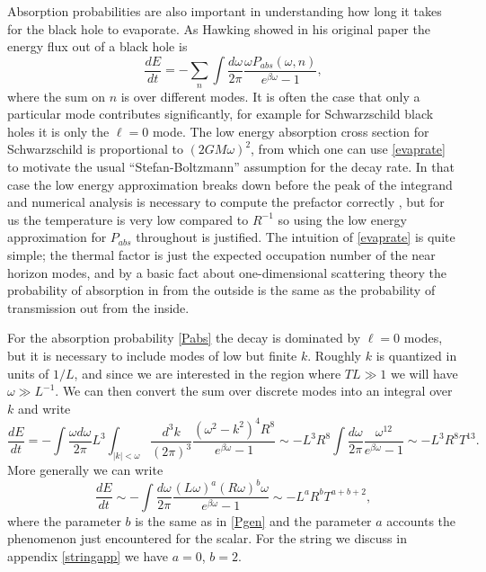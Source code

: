 \documentclass[12pt]{article}
\newcommand{\be}{\begin{equation}}
\newcommand{\ee}{\end{equation}}
\begin{document}
Absorption probabilities are also important in understanding how long it takes for the black hole to evaporate.  As Hawking showed in his original paper \cite{Hawking:1974sw} the energy flux out of a black hole is
\be\label{evaprate}
\frac{dE}{dt}=-\sum_n\int \frac{d\omega}{2\pi}\frac{\omega P_{abs}(\omega,n)}{e^{\beta\omega}-1},
\ee
where the sum on $n$ is over different modes.  It is often the case that only a particular mode contributes significantly, for example for Schwarzschild black holes it is only the $\ell=0$ mode.  The low energy absorption cross section for Schwarzschild is proportional to $(2GM\omega)^2$, from which one can use \eqref{evaprate} to motivate the usual ``Stefan-Boltzmann'' assumption for the decay rate.  In that case the low energy approximation breaks down before the peak of the integrand and numerical analysis is necessary to compute the prefactor correctly \cite{pageevap}, but for us the temperature is very low compared to $R^{-1}$ so using the low energy approximation for $P_{abs}$ throughout is justified.  The intuition of \eqref{evaprate} is quite simple; the thermal factor is just the expected occupation number of the near horizon modes, and by a basic fact about one-dimensional scattering theory the probability of absorption in from the outside is the same as the probability of transmission out from the inside.  

For the absorption probability \eqref{Pabs} the decay is dominated by $\ell=0$ modes, but it is necessary to include modes of low but finite $k$.  Roughly $k$ is quantized in units of $1/L$, and since we are interested in the region where $TL\gg1$ we will have $\omega\gg L^{-1}$.  We can then convert the sum over discrete modes into an integral over $k$ and write
\be
\frac{dE}{dt}=-\int \frac{\omega d\omega}{2\pi}L^3\int_{|k|<\omega}\frac{ d^3k}{(2\pi)^3}\frac{(\omega^2-k^2)^4 R^8}{e^{\beta\omega}-1}\sim -L^3R^8\int \frac{d\omega}{2\pi}\frac{\omega^{12}} {e^{\beta\omega}-1}\sim -L^3R^8T^{13}.
\ee
More generally we can write
\be\label{genevap}
\frac{dE}{dt}\sim-\int \frac{d\omega}{2\pi}\frac{(L\omega)^a(R\omega)^b\omega}{e^{\beta\omega}-1}\sim -L^a R^b T^{a+b+2},
\ee
where the parameter $b$ is the same as in \eqref{Pgen} and the parameter $a$ accounts the phenomenon just encountered for the scalar.  For the string we discuss in appendix \ref{stringapp} we have $a=0$, $b=2$.  
\end{document}
